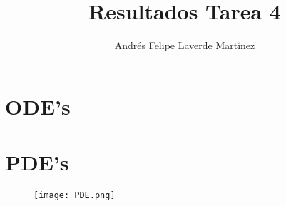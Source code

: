 \documentclass{article}
\begin{document}
\title{Resultados Tarea 4}
\author{Andrés Felipe Laverde Martínez}
\maketitle

\section{ODE's}

\begin{figure}

\end{figure}

\section{PDE's}

\begin{figure}[htb]
	\texttt{[image: PDE.png]}
		\caption{}
\end{figure}
\end{document}
